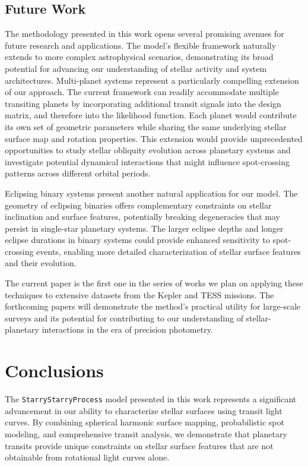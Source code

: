 \documentclass[twocolumn]{aastex631}
\newcommand{\sabinasays}[1]{{\color{purple}#1}}
\begin{document}
\sabinasays{\subsection{Future Work}
The methodology presented in this work opens several promising avenues for future research and applications. The model's flexible framework 
naturally extends to more complex astrophysical scenarios, demonstrating its broad potential for advancing our understanding of 
stellar activity and system architectures. Multi-planet systems represent a particularly compelling extension of our approach. 
The current framework can readily accommodate multiple transiting planets by incorporating additional transit signals into the design matrix, and therefore 
into the likelihood function. Each planet would contribute its own set of geometric parameters while sharing the same underlying 
stellar surface map and rotation properties. This extension would provide unprecedented opportunities to study stellar obliquity evolution 
across planetary systems and investigate potential dynamical interactions that might influence spot-crossing patterns across different orbital periods.

Eclipsing binary systems present another natural application for our model. The geometry of eclipsing binaries offers complementary constraints 
on stellar inclination and surface features, potentially breaking degeneracies that may persist in single-star planetary systems. 
The larger eclipse depths and longer eclipse durations in binary systems could provide enhanced sensitivity to spot-crossing events, 
enabling more detailed characterization of stellar surface features and their evolution.

The current paper is the first one in the series of works we plan on applying these techniques to extensive datasets from the 
Kepler and TESS missions. The forthcoming papers will demonstrate the method's practical utility for large-scale surveys and its 
potential for contributing to our understanding of stellar-planetary interactions in the era of precision photometry.}

\section{Conclusions}
The \texttt{StarryStarryProcess} model presented in this work represents a significant advancement in our ability to characterize stellar surfaces using transit light curves. 
By combining spherical harmonic surface mapping, probabilistic spot modeling, and comprehensive transit analysis, we demonstrate that planetary transits provide unique constraints on 
stellar surface features that are not obtainable from rotational light curves alone.
\end{document}
